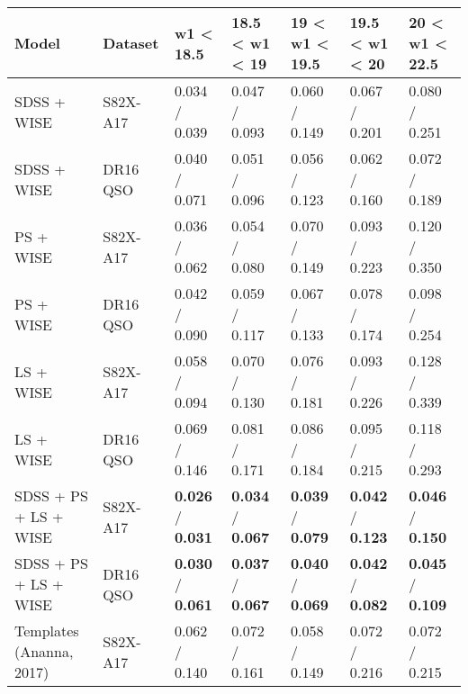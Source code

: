 \begin{table*}
    \centering
    \begin{tabular}{lllllll}
    \hline
                        Model &   Dataset &                        w1 < 18.5 &                   18.5 < w1 < 19 &                   19 < w1 < 19.5 &                   19.5 < w1 < 20 &                   20 < w1 < 22.5 \\
    \hline
                  SDSS + WISE &  S82X-A17 &                    0.034 / 0.039 &                    0.047 / 0.093 &                    0.060 / 0.149 &                    0.067 / 0.201 &                    0.080 / 0.251 \\
                  SDSS + WISE &  DR16 QSO &                    0.040 / 0.071 &                    0.051 / 0.096 &                    0.056 / 0.123 &                    0.062 / 0.160 &                    0.072 / 0.189 \\
                    PS + WISE &  S82X-A17 &                    0.036 / 0.062 &                    0.054 / 0.080 &                    0.070 / 0.149 &                    0.093 / 0.223 &                    0.120 / 0.350 \\
                    PS + WISE &  DR16 QSO &                    0.042 / 0.090 &                    0.059 / 0.117 &                    0.067 / 0.133 &                    0.078 / 0.174 &                    0.098 / 0.254 \\
                    LS + WISE &  S82X-A17 &                    0.058 / 0.094 &                    0.070 / 0.130 &                    0.076 / 0.181 &                    0.093 / 0.226 &                    0.128 / 0.339 \\
                    LS + WISE &  DR16 QSO &                    0.069 / 0.146 &                    0.081 / 0.171 &                    0.086 / 0.184 &                    0.095 / 0.215 &                    0.118 / 0.293 \\
        SDSS + PS + LS + WISE &  S82X-A17 &  \textbf{0.026} / \textbf{0.031} &  \textbf{0.034} / \textbf{0.067} &  \textbf{0.039} / \textbf{0.079} &  \textbf{0.042} / \textbf{0.123} &  \textbf{0.046} / \textbf{0.150} \\
        SDSS + PS + LS + WISE &  DR16 QSO &  \textbf{0.030} / \textbf{0.061} &  \textbf{0.037} / \textbf{0.067} &  \textbf{0.040} / \textbf{0.069} &  \textbf{0.042} / \textbf{0.082} &  \textbf{0.045} / \textbf{0.109} \\
     Templates (Ananna, 2017) &  S82X-A17 &                    0.062 / 0.140 &                    0.072 / 0.161 &                    0.058 / 0.149 &                    0.072 / 0.216 &                    0.072 / 0.215 \\

\end{tabular}
\end{table*}
